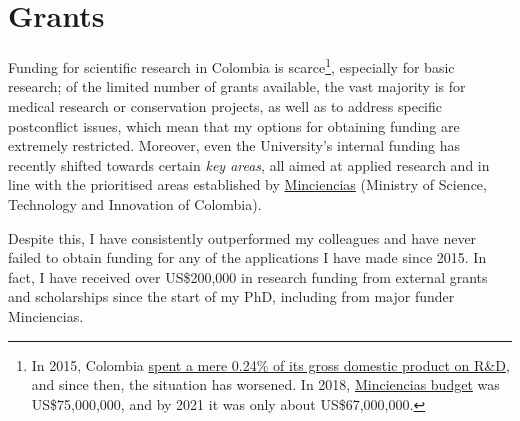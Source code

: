 \documentclass[11pt, a4paper]{awesome-cv}
\begin{document}
\hypertarget{grants}{%
\section{Grants}\label{grants}}

Funding for scientific research in Colombia is scarce\footnote{In 2015,
  Colombia
  \href{https://www.science.org/content/article/researchers-thought-peace-colombia-would-mean-more-science-funding-they-were-wrong}{spent
  a mere 0.24\% of its gross domestic product on R\&D}, and since then,
  the situation has worsened. In 2018,
  \href{https://www-infobae-com.translate.goog/america/colombia/2021/09/03/congresistas-piden-incrementar-el-presupuesto-de-minciencia-para-2022/?_x_tr_sl=es\&_x_tr_tl=en}{Minciencias
  budget} was US\$75,000,000, and by 2021 it was only about
  US\$67,000,000.}, especially for basic research; of the limited number
of grants available, the vast majority is for medical research or
conservation projects, as well as to address specific postconflict
issues, which mean that my options for obtaining funding are extremely
restricted. Moreover, even the University's internal funding has
recently shifted towards certain \emph{key areas}, all aimed at applied
research and in line with the prioritised areas established by
\href{https://minciencias.gov.co/\#}{Minciencias} (Ministry of Science,
Technology and Innovation of Colombia).

Despite this, I have consistently outperformed my colleagues and have
never failed to obtain funding for any of the applications I have made
since 2015. In fact, I have received over US\$200,000 in research
funding from external grants and scholarships since the start of my PhD,
including from major funder Minciencias.
\end{document}
